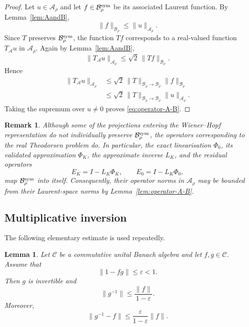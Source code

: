 \documentclass[11pt,a4paper]{amsart}
\newtheorem{lemma}[theorem]{Lemma}
\newtheorem{remark}[theorem]{Remark}
\begin{document}
\begin{proof}
	Let $u\in\mathcal A_\rho$ and let
	$f\in\mathcal B_\rho^{\rm sym}$ be its associated Laurent function.
	By Lemma~\ref{lem:AandB},
	\[
	\|f\|_{\mathcal B_\rho}
	\le
	\|u\|_{\mathcal A_\rho}.
	\]
	Since $T$ preserves $\mathcal B_\rho^{\rm sym}$, the function
	$Tf$ corresponds to a real-valued function $T_{\mathcal A}u$ in
	$\mathcal A_\rho$. Again by Lemma~\ref{lem:AandB},
	\[
	\|T_{\mathcal A}u\|_{\mathcal A_\rho}
	\le
	\sqrt2\,
	\|Tf\|_{\mathcal B_\rho}.
	\]
	Hence
	\[
	\begin{aligned}
		\|T_{\mathcal A}u\|_{\mathcal A_\rho}
		&\le
		\sqrt2\,
		\|T\|_{\mathcal B_\rho\to\mathcal B_\rho}
		\|f\|_{\mathcal B_\rho}
		\\
		&\le
		\sqrt2\,
		\|T\|_{\mathcal B_\rho\to\mathcal B_\rho}
		\|u\|_{\mathcal A_\rho}.
	\end{aligned}
	\]
	Taking the supremum over $u\ne0$ proves
	\eqref{eq:operator-A-B}.
\end{proof}
\begin{remark}\label{rem:symmetric-operators}
	Although some of the projections entering the Wiener--Hopf
	representation do not individually preserve
	$\mathcal B_\rho^{\rm sym}$, the operators corresponding to the
	real Theodorsen problem do. In particular, the exact linearisation
	$\Phi_0$, its validated approximation $\Phi_K$, the approximate
	inverse $L_K$, and the residual operators
	\[
	E_K=I-L_K\Phi_K,
	\qquad
	E_0=I-L_K\Phi_0,
	\]
	map $\mathcal B_\rho^{\rm sym}$ into itself.
	Consequently, their operator norms in $\mathcal A_\rho$ may be
	bounded from their Laurent-space norms by
	Lemma~\ref{lem:operator-A-B}.
\end{remark}

\subsection{Multiplicative inversion}

The following elementary estimate is used repeatedly.

\begin{lemma}\label{lem:inverse-banach}
	Let $\mathcal C$ be a commutative unital Banach algebra and let
	$f,g\in\mathcal C$. Assume that
	\[
	\|1-fg\|\le\varepsilon<1.
	\]
	Then $g$ is invertible and
	\[
	\|g^{-1}\|
	\le
	\frac{\|f\|}{1-\varepsilon}.
	\]
	Moreover,
	\[
	\|g^{-1}-f\|
	\le
	\frac{\varepsilon}{1-\varepsilon}\|f\|.
	\]
\end{lemma}
\end{document}
